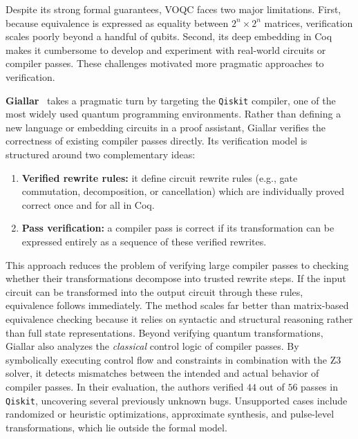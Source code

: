 Despite its strong formal guarantees, VOQC faces two major limitations.
First, because equivalence is expressed as equality between $2^n \times 2^n$ matrices, verification scales poorly beyond a handful of qubits.
Second, its deep embedding in Coq makes it cumbersome to develop and experiment with real-world circuits or compiler passes.
These challenges motivated more pragmatic approaches to verification.

\vspace{1em}

\textbf{Giallar}~\cite{tao2022giallar} takes a pragmatic turn by targeting the \texttt{Qiskit} compiler, one of the most widely used quantum programming environments.
Rather than defining a new language or embedding circuits in a proof assistant, Giallar verifies the correctness of existing compiler passes directly.
Its verification model is structured around two complementary ideas:

\begin{enumerate}
  \item \textbf{Verified rewrite rules:} it define circuit rewrite rules (e.g., gate commutation, decomposition, or cancellation) which are individually proved correct once and for all in Coq.
  \item \textbf{Pass verification:} a compiler pass is correct if its transformation can be expressed entirely as a sequence of these verified rewrites.
\end{enumerate}

This approach reduces the problem of verifying large compiler passes to checking whether their transformations decompose into trusted rewrite steps.
If the input circuit can be transformed into the output circuit through these rules, equivalence follows immediately.
The method scales far better than matrix-based equivalence checking because it relies on syntactic and structural reasoning rather than full state representations.
Beyond verifying quantum transformations, Giallar also analyzes the \emph{classical} control logic of compiler passes.
By symbolically executing control flow and constraints in combination with the Z3 solver, it detects mismatches between the intended and actual behavior of compiler passes.
In their evaluation, the authors verified $44$ out of $56$ passes in \texttt{Qiskit}, uncovering several previously unknown bugs.
Unsupported cases include randomized or heuristic optimizations, approximate synthesis, and pulse-level transformations, which lie outside the formal model.

